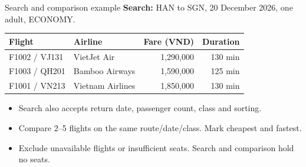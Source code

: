 \documentclass[t,aspectratio=169]{beamer}
\newcommand{\gap}{\par\vspace{0.18cm}}
\newenvironment{points}{\begin{itemize}\setlength{\itemsep}{6pt}}{\end{itemize}}
\begin{document}
\begin{frame}{Search and comparison example}
\small
\textbf{Search:} HAN to SGN, 20 December 2026, one adult, ECONOMY.
\gap
\begin{tabularx}{\textwidth}{@{}lYrr@{}}
\toprule
\textbf{Flight} & \textbf{Airline} & \textbf{Fare (VND)} & \textbf{Duration}\\
\midrule
F1002 / VJ131 & VietJet Air & 1,290,000 & 130 min\\
F1003 / QH201 & Bamboo Airways & 1,590,000 & 125 min\\
F1001 / VN213 & Vietnam Airlines & 1,850,000 & 130 min\\
\bottomrule
\end{tabularx}
\begin{points}
\item Search also accepts return date, passenger count, class and sorting.
\item Compare 2--5 flights on the same route/date/class. Mark cheapest and fastest.
\item Exclude unavailable flights or insufficient seats. Search and comparison hold no seats.
\end{points}
\end{frame}
\end{document}
